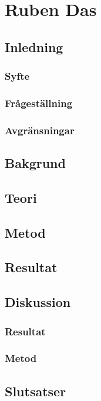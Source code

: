 \section{Ruben Das}
	\subsection{Inledning}
	\subsubsection{Syfte}
	\subsubsection{Frågeställning}
	\subsubsection{Avgränsningar}
	\subsection{Bakgrund}
	\subsection{Teori}
	\subsection{Metod}
	\subsection{Resultat}
	\subsection{Diskussion}
	\subsubsection{Resultat}
	\subsubsection{Metod}
	\subsection{Slutsatser}
